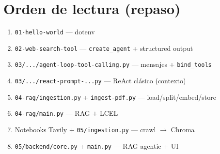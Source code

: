 \documentclass[11pt,a4paper]{article}
\begin{document}
\section{Orden de lectura (repaso)}

\begin{enumerate}[leftmargin=*]
  \item \texttt{01-hello-world} --- dotenv
  \item \texttt{02-web-search-tool} --- \texttt{create\_agent} + structured output
  \item \texttt{03/.../agent-loop-tool-calling.py} --- mensajes + \texttt{bind\_tools}
  \item \texttt{03/.../react-prompt-...py} --- ReAct clásico (contexto)
  \item \texttt{04-rag/ingestion.py} + \texttt{ingest-pdf.py} --- load/split/embed/store
  \item \texttt{04-rag/main.py} --- RAG $\pm$ LCEL
  \item Notebooks Tavily + \texttt{05/ingestion.py} --- crawl $\to$ Chroma
  \item \texttt{05/backend/core.py} + \texttt{main.py} --- RAG agentic + UI
\end{enumerate}

\vspace{1.2em}
\begin{center}
\end{center}
\end{document}
